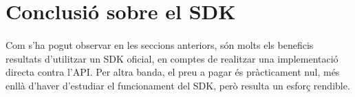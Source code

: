 \section{Conclusió sobre el SDK}

    \paragraph{}
    Com s'ha pogut observar en les seccions anteriors, són molts els beneficis resultats d'utilitzar un SDK oficial, en comptes de realitzar una implementació directa contra l’API. Per altra banda, el preu a pagar és pràcticament nul, més enllà d'haver d'estudiar el funcionament del SDK, però resulta un esforç rendible.
